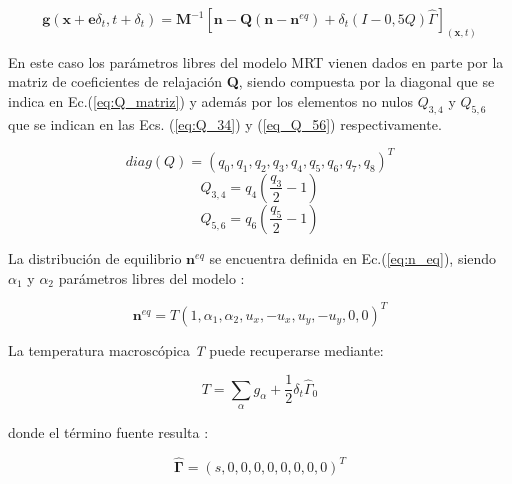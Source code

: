 \begin{equation}
    \mathbf{g}(\mathbf{x} + \mathbf{e} \delta_{t} ,t + \delta_{t}) = \mathbf{M}^{-1} \left[ \mathbf{n} - \mathbf{Q}(\mathbf{n} - \mathbf{n}^{eq}) + \delta_{t} \left( I - 0,5 Q \right) \hat{\Gamma}  \right]_{(\mathbf{x},t)}
    \label{eq:fieldenergy}
\end{equation}

En este caso los parámetros libres del modelo MRT vienen dados en parte por la matriz de coeficientes de relajación \textbf{Q}, siendo compuesta por la diagonal que se indica en Ec.(\ref{eq:Q_matriz}) y además por los elementos no nulos $Q_{3,4}$ y $ Q_{5,6}$ que se indican en las Ecs. (\ref{eq:Q_34}) y (\ref{eq_Q_56})  respectivamente.

\begin{equation}
    \textit{diag} (Q) = {( q_{0} , q_{1} , q_{2} , q_{3} , q_{4} , q_{5} , q_{6} , q_{7} , q_{8} )}^{T}
    \label{eq:Q_matriz}
\end{equation}
\begin{equation}
    Q_{3,4} = q_{4} \left( \frac{q_{3}}{2} - 1 \right)
    \label{eq:Q_34}
\end{equation}
\begin{equation}
    Q_{5,6} = q_{6} \left( \frac{q_{5}}{2} - 1 \right)
    \label{eq_Q_56}
\end{equation}

La distribución de equilibrio $\mathbf{n}^{eq}$ se encuentra definida en Ec.(\ref{eq:n_eq}), siendo $\alpha_{1}$ y $\alpha_{2}$ parámetros libres del modelo :

\begin{equation}
    {\mathbf{n}}^{eq} = T { \left( 1, \alpha_{1}, \alpha_{2}, u_{x}, -u_{x}, u_{y}, -u_{y}, 0, 0 \right) }^{T}
    \label{eq:n_eq}
\end{equation}

La temperatura macroscópica \textit{T} puede recuperarse mediante:

\begin{equation}
T = \sum_{\alpha} g_{\alpha} + \frac{1}{2} \delta_{t} {\hat{\Gamma}}_{0}
\label{eq:temperatura}
\end{equation}



donde el término fuente resulta :


\begin{equation}
    \mathbf{\hat{\Gamma}} = {( s, 0, 0, 0, 0, 0, 0, 0, 0 )}^{T}
\end{equation}

